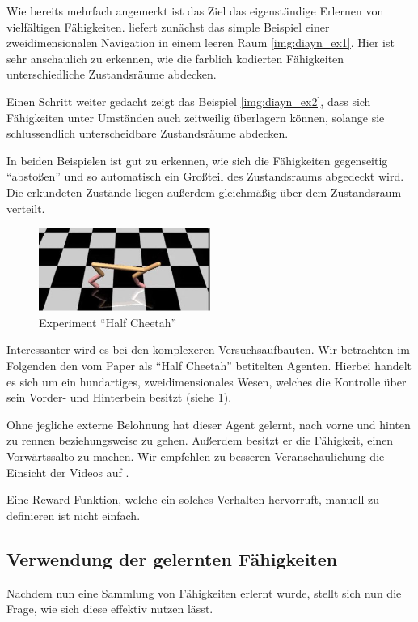 Wie bereits mehrfach angemerkt ist das Ziel das eigenständige Erlernen von vielfältigen Fähigkeiten. \cite{diversity_eysenbach} liefert zunächst das simple Beispiel einer zweidimensionalen Navigation in einem leeren Raum \ref{img:diayn_ex1}. Hier ist sehr anschaulich zu erkennen, wie die farblich kodierten Fähigkeiten unterschiedliche Zustandsräume abdecken.

Einen Schritt weiter gedacht zeigt das Beispiel \ref{img:diayn_ex2}, dass sich Fähigkeiten unter Umständen auch zeitweilig überlagern können, solange sie schlussendlich unterscheidbare Zustandsräume abdecken.

\smallspace

In beiden Beispielen ist gut zu erkennen, wie sich die Fähigkeiten gegenseitig ``abstoßen'' und so automatisch ein Großteil des Zustandsraums abgedeckt wird. Die erkundeten Zustände liegen außerdem gleichmäßig über dem Zustandsraum verteilt.

\smallspace

\begin{figure}[h]
\includegraphics[width=0.5\textwidth, keepaspectratio=true, center]{images/cheetah_image.JPG}
\caption{Experiment ``Half Cheetah''} \label{img:cheetah_ex}
\end{figure}

Interessanter wird es bei den komplexeren Versuchsaufbauten. Wir betrachten im Folgenden den vom Paper \cite{diversity_eysenbach} als ``Half Cheetah'' betitelten Agenten. Hierbei handelt es sich um ein hundartiges, zweidimensionales Wesen, welches die Kontrolle über sein Vorder- und Hinterbein besitzt (siehe \ref{img:cheetah_ex}).

Ohne jegliche externe Belohnung hat dieser Agent gelernt, nach vorne und hinten zu rennen beziehungsweise zu gehen. Außerdem besitzt er die Fähigkeit, einen Vorwärtssalto zu machen. Wir empfehlen zu besseren Veranschaulichung die Einsicht der Videos auf \cite{diversity_web}.

Eine Reward-Funktion, welche ein solches Verhalten hervorruft, manuell zu definieren ist nicht einfach.

\subsection{Verwendung der gelernten Fähigkeiten}
\label{sec:diversityusage}
Nachdem nun eine Sammlung von Fähigkeiten erlernt wurde, stellt sich nun die Frage, wie sich diese effektiv nutzen lässt.

